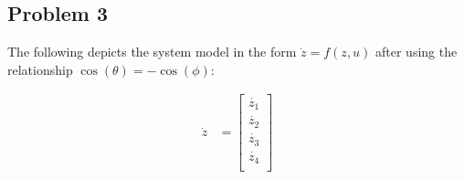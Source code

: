 \documentclass[12pt, letterpaper, onecolumn]{article}
\begin{document}
\subsection*{Problem 3}
The following depicts the system model in the form $\dot{z} = f(z,u)$ after using the relationship $\cos(\theta) = -\cos(\phi)$:

\begin{equation*}
    \begin{split}
        \dot{z} & =
        \begin{bmatrix}
            \dot{z_1} \\
            \dot{z_2} \\
            \dot{z_3} \\
            \dot{z_4} \\
        \end{bmatrix} \\
    \end{split}
\end{equation*}
\end{document}
